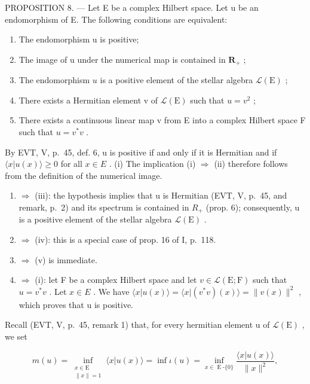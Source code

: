 PROPOSITION 8. --- Let E be a complex Hilbert space. Let u be an endomorphism of E. The following conditions are equivalent:

\begin{enumerate}
\def\labelenumi{(\roman{enumi})}
\item
  The endomorphism u is positive;
\item
  The image of u under the numerical map is contained in \(\mathbf{R}_{+}\) ;
\item
  The endomorphism \(u\) is a positive element of the stellar algebra \(\mathcal{L}(\mathrm{E})\) ;
\item
  There exists a Hermitian element v of \(\mathcal{L}(\mathrm{E})\) such that \(u = v^2\) ;
\item
  There exists a continuous linear map v from E into a complex Hilbert space F such that \(u = v^{*}v\) .
\end{enumerate}

By EVT, V, p.~45, def. 6, u is positive if and only if it is Hermitian and if \(\langle x|u(x)\rangle\geqslant0\) for all \(x\in E\) . (i) The implication (i) \(\Longrightarrow\) (ii) therefore follows from the definition of the numerical image.

\begin{enumerate}
\def\labelenumi{(\roman{enumi})}
\setcounter{enumi}{1}
\item
  \(\Longrightarrow\) (iii): the hypothesis implies that u is Hermitian (EVT, V, p.~45, and remark, p.~2) and its spectrum is contained in \(R_{+}\) (prop. 6); consequently, u is a positive element of the stellar algebra \(\mathcal{L}(\mathrm{E})\) .
\item
  \(\Longrightarrow\) (iv): this is a special case of prop. 16 of I, p.~118.
\item
  \(\Longrightarrow\) (v) is immediate.
\item
  \(\Longrightarrow\) (i): let F be a complex Hilbert space and let \(v \in \mathcal{L}(\mathrm{E};\mathrm{F})\) such that \(u = v^{*}v\) . Let \(x \in E\) . We have \(\langle x|u(x)\rangle = \langle x|(v^{*}v)(x)\rangle = \|v(x)\|^{2}\) , which proves that u is positive.
\end{enumerate}

Recall (EVT, V, p.~45, remark 1) that, for every hermitian element u of \(\mathcal{L}(\mathrm{E})\) , we set

\[
m(u) = \inf_{\substack{x\in \mathrm{E}\\ \| x\| = 1}}\langle x|u(x)\rangle = \inf \iota (u) = \inf_{x\in \operatorname{E}\text{-}\{0\}}\frac{\langle x|u(x)\rangle}{\|x\|^ {2}},
\]

